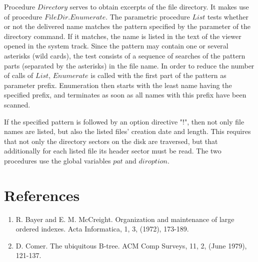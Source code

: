 Procedure $Directory$ serves to obtain excerpts of the file directory. It makes use of procedure
$FileDir.Enumerate$. The parametric procedure $List$ tests whether or not the delivered name
matches the pattern specified by the parameter of the directory command. If it matches, the name
is listed in the text of the viewer opened in the system track. Since the pattern may contain one or
several asterisks (wild cards), the test consists of a sequence of searches of the pattern parts
(separated by the asterisks) in the file name. In order to reduce the number of calls of $List$,
$Enumerate$ is called with the first part of the pattern as parameter prefix. Enumeration then starts
with the least name having the specified prefix, and terminates as soon as all names with this
prefix have been scanned.

If the specified pattern is followed by an option directive "!", then not only file names are listed, but
also the listed files' creation date and length. This requires that not only the directory sectors on
the disk are traversed, but that additionally for each listed file its header sector must be read. The
two procedures use the global variables $pat$ and $diroption$.

\section*{References}
\begin{enumerate}
	\item R. Bayer and E. M. McCreight. Organization and maintenance of large ordered indexes. Acta Informatica, 1, 3, (1972), 173-189.

	\item D. Comer. The ubiquitous B-tree. ACM Comp Surveys, 11, 2, (June 1979), 121-137.
\end{enumerate}
